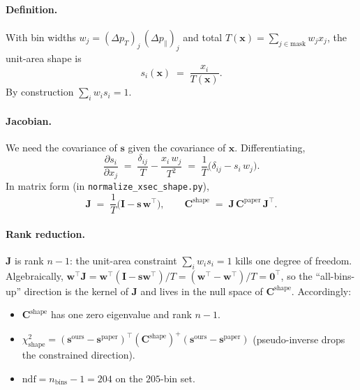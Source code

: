 \documentclass[12pt]{article}
\newcommand{\pT}{p_{T}}
\newcommand{\pPar}{p_{\parallel}}
\newcommand{\ours}{\text{ours}}
\newcommand{\paper}{\text{paper}}
\newcommand{\T}{^{\!\top}}
\begin{document}
\paragraph{Definition.}
With bin widths $w_{j} = (\Delta\pT)_{j}\,(\Delta\pPar)_{j}$ and total
$T(\mathbf{x}) = \sum_{j\in\text{mask}} w_{j}x_{j}$, the unit-area
shape is
\begin{equation}
s_{i}(\mathbf{x}) \;=\; \frac{x_{i}}{T(\mathbf{x})}.
\end{equation}
By construction $\sum_{i} w_{i} s_{i} = 1$.

\paragraph{Jacobian.}
We need the covariance of $\mathbf{s}$ given the covariance of
$\mathbf{x}$. Differentiating,
\begin{equation}
\frac{\partial s_{i}}{\partial x_{j}}
\;=\;
\frac{\delta_{ij}}{T} - \frac{x_{i}\,w_{j}}{T^{2}}
\;=\;
\frac{1}{T}\big(\delta_{ij} - s_{i}\,w_{j}\big).
\end{equation}
In matrix form (in \texttt{normalize\_xsec\_shape.py}),
\begin{equation}
\mathbf{J} \;=\; \frac{1}{T}\big(\mathbf{I} - \mathbf{s}\,\mathbf{w}\T\big),
\qquad
\mathbf{C}^{\text{shape}} \;=\; \mathbf{J}\,\mathbf{C}^{\paper}\,\mathbf{J}\T.
\end{equation}

\paragraph{Rank reduction.}
$\mathbf{J}$ is rank $n-1$: the unit-area constraint $\sum_{i} w_{i}
s_{i} = 1$ kills one degree of freedom. Algebraically,
$\mathbf{w}\T\mathbf{J} = \mathbf{w}\T(\mathbf{I}-\mathbf{s}\mathbf{w}\T)/T
= (\mathbf{w}\T - \mathbf{w}\T)/T = \mathbf{0}\T$, so the
``all-bins-up'' direction is the kernel of $\mathbf{J}$ and lives in
the null space of $\mathbf{C}^{\text{shape}}$. Accordingly:
\begin{itemize}[nosep]
  \item $\mathbf{C}^{\text{shape}}$ has one zero eigenvalue and rank $n-1$.
  \item $\chi^{2}_{\text{shape}} = (\mathbf{s}^{\ours}-\mathbf{s}^{\paper})\T
        (\mathbf{C}^{\text{shape}})^{+} (\mathbf{s}^{\ours}-\mathbf{s}^{\paper})$
        (pseudo-inverse drops the constrained direction).
  \item $\mathrm{ndf} = n_{\text{bins}} - 1 = 204$ on the
        $205$-bin set.
\end{itemize}
\end{document}
